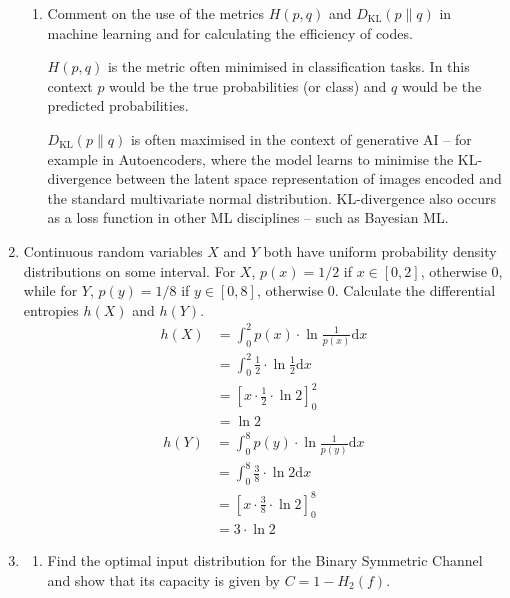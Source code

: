 \documentclass[10pt,\jkfside,a4paper]{article}
\begin{document}
\begin{enumerate}
\begin{enumerate}
        \item Comment on the use of the metrics $H(p, q)$ and $D_{\mathrm{KL}}(p \parallel q)$ in machine learning and for calculating the efficiency of codes.

        $H(p, q)$ is the metric often minimised in classification tasks. In this context $p$ would be the true probabilities (or class) and $q$ would be the predicted probabilities.

        $D_{\mathrm{KL}}(p \parallel q)$ is often maximised in the context of generative AI -- for example in Autoencoders, where the model learns to minimise the KL-divergence between the latent space representation of images encoded and the standard multivariate normal distribution. KL-divergence also occurs as a loss function in other ML disciplines -- such as Bayesian ML.

    \end{enumerate}

    \item Continuous random variables $X$ and $Y$ both have uniform probability density distributions on some interval. For $X$, $p(x) = 1/2$ if $x \in [0, 2]$, otherwise $0$, while for $Y$, $p(y) = 1/8$ if $y \in [0, 8]$, otherwise $0$. Calculate the differential entropies $h(X)$ and $h(Y)$.
    \begin{align*}
        h(X)
        &= \int^2_0 p(x) \cdot \ln \frac1{p(x)} \mathrm{d}x \\
        &= \int^2_0 \frac12 \cdot \ln \frac12 \mathrm{d}x \\
        &= \left[x \cdot \frac12 \cdot \ln 2 \right]^2_0 \\
        &= \ln 2
    \end{align*}
    \begin{align*}
        h(Y)
        &= \int^8_0 p(y) \cdot \ln \frac{1}{p(y)} \mathrm{d}x \\
        &= \int^8_0 \frac38 \cdot \ln 2 \mathrm{d}x \\
        &= \left[x \cdot \frac38 \cdot \ln 2 \right]^8_0 \\
        &= 3\cdot \ln 2
    \end{align*}

    \item

    \begin{enumerate}

        \item Find the optimal input distribution for the Binary Symmetric Channel and show that its capacity is given by $C = 1 - H_2(f)$.


\end{enumerate}
\end{enumerate}
\end{document}
